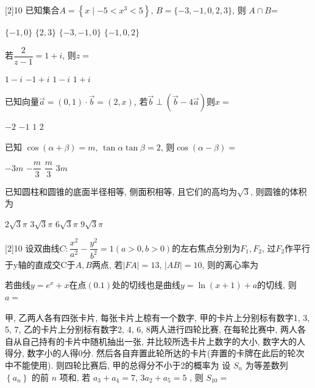 \documentclass[addtable,twoside,12pt]{hynuexam2024}
\begin{document}
\begin{questions}
		[2]{10}
		\question 已知集合$A=\left\{x \mid-5<x^{3}<5\right\}$, $B=\{-3,-1,0,2,3\} $, 则  $A \cap B$=\chABCD[]

		\begin{oneparchoices}
			\choice $\{-1,0\}$
			\choice $\{2,3\}$
			\choice $\{-3,-1,0\}$
			\choice $ \{-1,0,2\}  $
		\end{oneparchoices}

		\question  若$\dfrac{2}{z-1}=1+i$, 则$z=$\chABCD[]

		\begin{oneparchoices}
			\choice $1-i$
			\choice $-1+i$
			\choice $1-i$
			\choice $1+i $
		\end{oneparchoices}

		\question  已知向量$\vec{a}=(0,1) \cdot \vec{b}=(2,x)$, 若$\vec{b} \perp(\vec{b}-4\vec{a})$则$x=$\chABCD[]

		\begin{oneparchoices}
			\choice $-2$
			\choice  $-1$
			\choice  $1$
			\choice $2$
		\end{oneparchoices}

		\question  已知  $\cos (\alpha +\beta)=m$, $\tan \alpha  \tan \beta=2$, 则$\cos (\alpha -\beta)=$\chABCD[]

		\begin{oneparchoices}
			\choice $-3m$
			\choice $-\dfrac{m}{3}$
			\choice $\dfrac{m}{3}$
			\CorrectChoice  $3m$
		\end{oneparchoices}

		\question  已知圆柱和圆锥的底面半径相等, 侧面积相等, 且它们的高均为$\sqrt{3}$, 则圆锥的体积为\chABCD[]

		\begin{oneparchoices}
			\choice$2 \sqrt{3} \pi$
			\choice$3 \sqrt{3} \pi$
			\choice  $6 \sqrt{3} \pi$
			\CorrectChoice $9 \sqrt{3} \pi$
		\end{oneparchoices}

		[2]{10}\setlength\fillinlinelength{1in}%
		\question 设双曲线$C: \dfrac{x^{2}}{a^{2}}-\dfrac{y^{2}}{b^{2}}=1(a>0, b>0)$的左右焦点分别为$F_{1}, F_{2}$, 过$ F_{2}$作平行于y轴的直成交C于$A, B$两点, 若$|FA|=13$, $|A B|=10$, 则的离心率为\fillanswer

		\question 若曲线$y=e^{x}+x$在点$(0.1)$处的切线也是曲线$ y=\ln (x+1)+a $的切线, 则$a=$\fillin

		\question 甲, 乙两人各有四张卡片, 每张卡片上椋有一个数字, 甲的卡片上分别标有数字1, 3, 5, 7, 乙的卡片上分别标有数字2, 4, 6, 8两人进行四轮比赛, 在每轮比赛中, 两人各自从自己持有的卡片中随机抽出一张, 并比较所选卡片上数字的大小, 数字大的人得分, 数字小的人得0分. 然后各自弃置此轮所达的卡片(弃置的卡牌在此后的轮次中不能使用). 则四轮比赛后, 甲的总得分不小于2的概率为\fillin[][2in]
		\question 设 $S_n$ 为等差数列 $\left\{a_n\right\}$ 的前 $n$ 项和,  若 $a_3+a_4=7 $,    $3 a_2+a_5=5$ ,  则 $S_{10}=$ \fillin


\end{questions}
\end{document}
